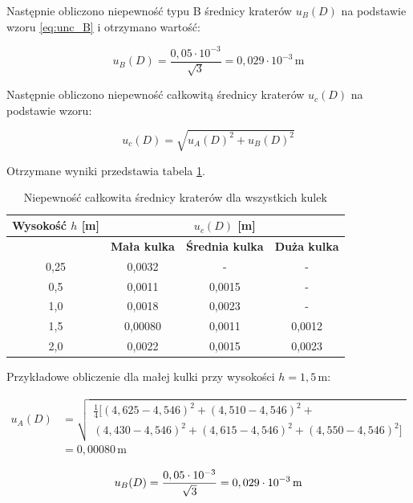 \documentclass[a4paper,12pt]{article}
\begin{document}
Następnie obliczono niepewność typu B średnicy kraterów $u_B(D)$ na podstawie wzoru \eqref{eq:unc_B} i otrzymano wartość:

$$
    u_B(D) = \frac{0,05 \cdot 10^{-3}}{\sqrt{3}} = 0,029 \cdot 10^{-3} \, \text{m}
$$

Następnie obliczono niepewność całkowitą średnicy kraterów $u_c(D)$ na podstawie wzoru:

\[
    u_c(D) = \sqrt{u_A(D)^2 + u_B(D)^2}
\]

Otrzymane wyniki przedstawia tabela \ref{tab:niepewnosc_calkowita_srednicy}.

\begin{table}[H]
    \centering
    \begin{tabular}{|c|c|c|c|}
        \hline
        \textbf{Wysokość $h$ [m]} & \multicolumn{3}{c|}{\textbf{$u_c(D)$ [m]}} \\
        \hline
        & \textbf{Mała kulka} & \textbf{Średnia kulka} & \textbf{Duża kulka} \\
        \hline
        0,25 & 0,0032 & - & - \\
        \hline
        0,5  & 0,0011 & 0,0015 & - \\
        \hline
        1,0  & 0,0018 & 0,0023 & - \\
        \hline
        1,5  & 0,00080 & 0,0011 & 0,0012 \\
        \hline
        2,0  & 0,0022 & 0,0015 & 0,0023 \\
        \hline
    \end{tabular}
    \caption{Niepewność całkowita średnicy kraterów dla wszystkich kulek}
    \label{tab:niepewnosc_calkowita_srednicy}
\end{table}

Przykładowe obliczenie dla małej kulki przy wysokości $h=1,5\,\text{m}$:

\begin{align*}
    u_A(D) & = \sqrt{\begin{gathered}
                             \frac{1}{4} [(4,625 - 4,546)^2 + (4,510 - 4,546)^2 + \\
                                 (4,430 - 4,546)^2 + (4,615 - 4,546)^2 + (4,550 - 4,546)^2]
                         \end{gathered}} \\
           & = 0,00080\,\text{m}
\end{align*}

$$
    u_B(D) = \frac{0,05 \cdot 10^{-3}}{\sqrt{3}} = 0,029 \cdot 10^{-3} \, \text{m} \\[1em]
$$
\end{document}
